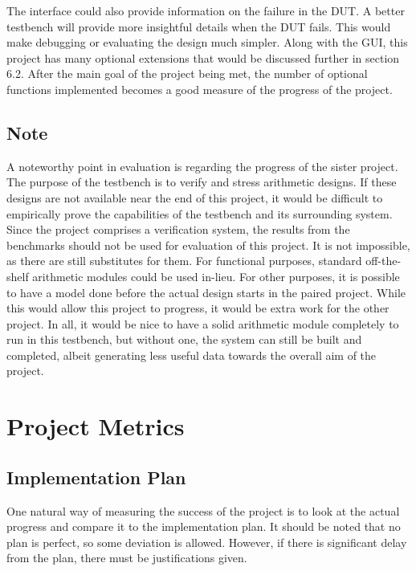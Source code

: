 The interface could also provide information on the failure in the DUT.
A better testbench will provide more insightful details when the DUT fails.
This would make debugging or evaluating the design much simpler.
Along with the GUI, this project has many optional extensions that would be discussed further in section 6.2.
After the main goal of the project being met, the number of optional functions implemented becomes a good measure of the progress of the project.

\subsection{Note}
A noteworthy point in evaluation is regarding the progress of the sister project.
The purpose of the testbench is to verify and stress arithmetic designs.
If these designs are not available near the end of this project, it would be difficult to empirically prove the capabilities of the testbench and its surrounding system.
Since the project comprises a verification system, the results from the benchmarks should not be used for evaluation of this project.
It is not impossible, as there are still substitutes for them.
For functional purposes, standard off-the-shelf arithmetic modules could be used in-lieu.
For other purposes, it is possible to have a model done before the actual design starts in the paired project.
While this would allow this project to progress, it would be extra work for the other project.
In all, it would be nice to have a solid arithmetic module completely to run in this testbench, but without one, the system can still be built and completed, albeit generating less useful data towards the overall aim of the project.



\section{Project Metrics}
\subsection{Implementation Plan}
One natural way of measuring the success of the project is to look at the actual progress and compare it to the implementation plan.
It should be noted that no plan is perfect, so some deviation is allowed.
However, if there is significant delay from the plan, there must be justifications given.


